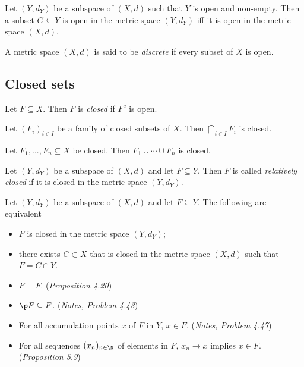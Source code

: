 \documentclass{article}
\begin{document}
\begin{proposition}
    Let $(Y,d_Y)$ be a subspace of $(X,d)$ such that $Y$ is open and non-empty. Then a
    subset $G\subseteq Y$ is open in the metric space $(Y,d_Y)$ iff it is open in the
    metric space $(X,d)$.
\end{proposition}

\begin{definition}
    A metric space $(X,d)$ is said to be \emph{discrete} if every subset of $X$ is open.
\end{definition}

\subsection{Closed sets}

\begin{definition}
    Let $F\subseteq X$. Then $F$ is \emph{closed} if $F^c$ is open.
\end{definition}

\begin{theorem}[Notes 4.20]
    Let $(F_i)_{i\in I}$ be a family of closed subsets of $X$. Then $\bigcap_{i\in I}F_i$
    is closed.
\end{theorem}

\begin{theorem}[Notes 4.21]
    Let $F_1,...,F_n\subseteq X$ be closed. Then $F_1\cup\cdots\cup F_n$ is closed.
\end{theorem}

\begin{definition}
    Let $(Y,d_Y)$ be a subspace of $(X,d)$ and let $F\subseteq Y$. Then $F$ is called
    \emph{relatively closed} if it is closed in the metric space $(Y,d_Y)$.
\end{definition}

\begin{proposition}
    Let $(Y,d_Y)$ be a subspace of $(X,d)$ and let $F\subseteq Y$. The following are
    equivalent
    \begin{itemize}
        \item $F$ is closed in the metric space $(Y,d_Y)$;
        \item there exists $C\subset X$ that is closed in the metric space $(X,d)$ such that
              $F=C\cap Y$.
        \item $F=\overline F$. (\emph{Proposition 4.20})
        \item $\p F\subseteq F$. (\emph{Notes, Problem 4.43})
        \item For all accumulation points $x$ of $F$ in $Y$, $x\in F$. (\emph{Notes, Problem 4.47})
        \item For all sequences $(x_n)_{n\in\N}$ of elements in $F$, $x_n\to x$ implies $x\in F$. (\emph{Proposition 5.9})
    \end{itemize}
\end{proposition}
\end{document}
